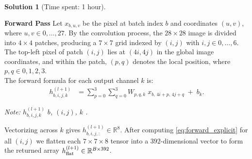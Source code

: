 \documentclass[11pt, reqno, letterpaper, twoside]{amsart}
\theoremstyle{plain}
\theoremstyle{definition}
\newtheorem{solution}[theorem]{Solution}
\begin{document}
\begin{solution}[Time spent: 1 hour]
\begin{enumerate}
\noindent \textbf{Forward Pass}
Let $x_{b,u,v}$ be the pixel at batch index $b$ and coordinates $(u,v)$, where $u,v \in {0,\dots,27}$. By the convolution process, the $28\times28$ image is divided into $4\times4$ patches, producing a $7\times7$ grid indexed by $(i,j)$ with $i,j \in {0,\dots,6}$. The top-left pixel of patch $(i,j)$ lies at $(4i,4j)$ in the global image coordinates, and within the patch, $(p,q)$ denotes the local position, where $p,q \in {0,1,2,3}$. \\

The forward formula for each output channel $k$ is:
\begin{align}
h^{(l+1)}_{b,i,j,k}
&= \sum_{p=0}^{3}\sum_{q=0}^{3} W_{p,q,k}\; x_{b,\,4i+p,\,4j+q} \;+\; b_k.
\label{eq:forward_explicit}
\end{align}

\textit{Note: $h^{(l+1)}_{b,i,j,k}$  $b$,  $(i,j)$,  $k$ .
}

Vectorizing across $k$ gives $h^{(l+1)}_{b,i,j,:}\in\mathbb{R}^8$. After computing \eqref{eq:forward_explicit} for all $(i,j)$ we flatten each $7\times7\times8$ tensor into a $392$-dimensional vector to form the returned array $h^{(l+1)}_{{\rm flat}} \in \mathbb{R}^{B\times 392}$. \\


\end{enumerate}
\end{solution}
\end{document}

